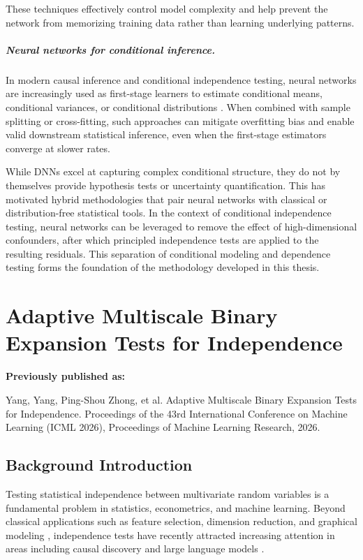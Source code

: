 \documentclass[12pt,reqno,oneside]{amsbook}
\theoremstyle{definition}
\theoremstyle{remark}
\begin{document}
These techniques effectively control model complexity and help prevent the
network from memorizing training data rather than learning underlying
patterns.

\paragraph{Neural networks for conditional inference.}
In modern causal inference and conditional independence testing, neural
networks are increasingly used as first-stage learners to estimate conditional
means, conditional variances, or conditional distributions
\cite{Chernozhukov2018}. When combined with sample splitting or cross-fitting,
such approaches can mitigate overfitting bias and enable valid downstream
statistical inference, even when the first-stage estimators converge at slower
rates.


While DNNs excel at capturing complex conditional structure, they do not by
themselves provide hypothesis tests or uncertainty quantification. This has
motivated hybrid methodologies that pair neural networks with classical or
distribution-free statistical tools. In the context of conditional
independence testing, neural networks can be leveraged to remove the effect of
high-dimensional confounders, after which principled independence tests are
applied to the resulting residuals. This separation of conditional modeling
and dependence testing forms the foundation of the methodology developed in
this thesis.


\chapter{Adaptive Multiscale Binary Expansion Tests for Independence}
\label{Adaptive_test}
\noindent\textbf{Previously published as:}

Yang, Yang, Ping-Shou Zhong, et al. Adaptive Multiscale Binary Expansion Tests for Independence. Proceedings of the 43rd International Conference on Machine Learning (ICML 2026), Proceedings of Machine Learning Research, 2026.

\section{Background Introduction}

Testing statistical independence between multivariate random variables is a fundamental problem in statistics, econometrics, and machine learning. Beyond classical applications such as feature selection, dimension reduction, and graphical modeling \cite{Cai2018FeatureSM,Waggoner_2021}, independence tests have recently attracted increasing attention in areas including causal discovery \cite{Dai2022IndependenceTA} and large language models \cite{zhu2025independence_icml}.
\end{document}
